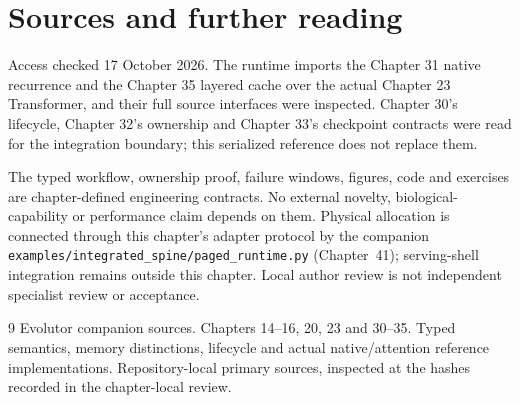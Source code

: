 \chapter*{Sources and further reading}
Access checked 17 October 2026. The runtime imports the Chapter 31 native recurrence and the Chapter 35 layered cache over the actual Chapter 23 Transformer, and their full source interfaces were inspected. Chapter 30's lifecycle, Chapter 32's ownership and Chapter 33's checkpoint contracts were read for the integration boundary; this serialized reference does not replace them.

The typed workflow, ownership proof, failure windows, figures, code and
exercises are chapter-defined engineering contracts. No external novelty,
biological-capability or performance claim depends on them. Physical allocation is connected through this chapter's adapter protocol by the companion \texttt{examples/integrated\_spine/paged\_runtime.py} (Chapter~41); serving-shell integration remains outside this chapter.
Local author review is not independent specialist review or acceptance.
\begingroup
\renewcommand{\bibname}{References}
\let\chapter\section
\begin{thebibliography}{9}
 Evolutor companion sources. Chapters 14--16, 20,
23 and 30--35. Typed semantics, memory distinctions, lifecycle and actual
native/attention reference implementations. Repository-local primary sources,
inspected at the hashes recorded in the chapter-local review.
\end{thebibliography}
\endgroup
